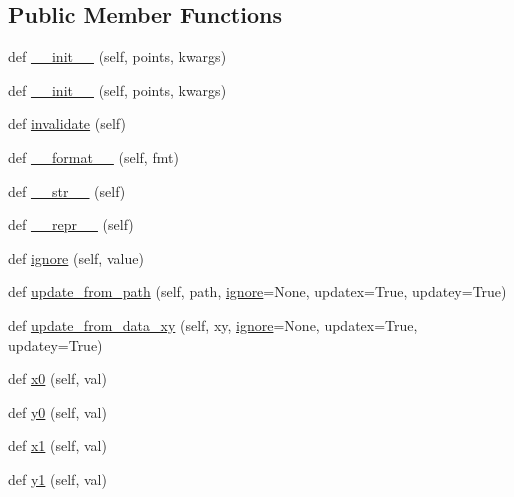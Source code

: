 \subsection*{Public Member Functions}
\begin{DoxyCompactItemize}
\item 
def \hyperlink{classmatplotlib_1_1transforms_1_1Bbox_a4d30c401a865a35a1e30520f5f65120b}{\+\_\+\+\_\+init\+\_\+\+\_\+} (self, points, kwargs)
\item 
def \hyperlink{classmatplotlib_1_1transforms_1_1Bbox_a4d30c401a865a35a1e30520f5f65120b}{\+\_\+\+\_\+init\+\_\+\+\_\+} (self, points, kwargs)
\item 
def \hyperlink{classmatplotlib_1_1transforms_1_1Bbox_a9842585b9b25c2b10a67a7da0a62acd4}{invalidate} (self)
\item 
def \hyperlink{classmatplotlib_1_1transforms_1_1Bbox_a3754b25e7d943dbe45cc8c89d3cca7d1}{\+\_\+\+\_\+format\+\_\+\+\_\+} (self, fmt)
\item 
def \hyperlink{classmatplotlib_1_1transforms_1_1Bbox_a40c1266c8d3d8a01597c22b5ca1c8a10}{\+\_\+\+\_\+str\+\_\+\+\_\+} (self)
\item 
def \hyperlink{classmatplotlib_1_1transforms_1_1Bbox_ac40f57389582e08d00a59073fece670d}{\+\_\+\+\_\+repr\+\_\+\+\_\+} (self)
\item 
def \hyperlink{classmatplotlib_1_1transforms_1_1Bbox_a4e5249c93be234e4b73701e903db6ecd}{ignore} (self, value)
\item 
def \hyperlink{classmatplotlib_1_1transforms_1_1Bbox_af6614dedf5efd2a66d2b8c5e63126736}{update\+\_\+from\+\_\+path} (self, path, \hyperlink{classmatplotlib_1_1transforms_1_1Bbox_a4e5249c93be234e4b73701e903db6ecd}{ignore}=None, updatex=True, updatey=True)
\item 
def \hyperlink{classmatplotlib_1_1transforms_1_1Bbox_a14c151102e281f7c5c7ca8c586ff7629}{update\+\_\+from\+\_\+data\+\_\+xy} (self, xy, \hyperlink{classmatplotlib_1_1transforms_1_1Bbox_a4e5249c93be234e4b73701e903db6ecd}{ignore}=None, updatex=True, updatey=True)
\item 
def \hyperlink{classmatplotlib_1_1transforms_1_1Bbox_a2205c0684b77bfbc2c7a053a0bda7fda}{x0} (self, val)
\item 
def \hyperlink{classmatplotlib_1_1transforms_1_1Bbox_a0bd437549aae55a13e0d43517ecc70f3}{y0} (self, val)
\item 
def \hyperlink{classmatplotlib_1_1transforms_1_1Bbox_aef16e2063a7335c6e768c35079244341}{x1} (self, val)
\item 
def \hyperlink{classmatplotlib_1_1transforms_1_1Bbox_a0fa7ba7de3a89c6834f94e9df955fd81}{y1} (self, val)

\end{DoxyCompactItemize}
